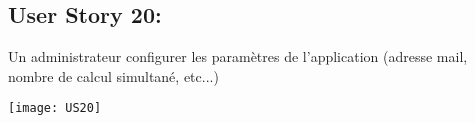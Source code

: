 \newpage{}
\subsection{User Story 20:}
Un administrateur configurer les paramètres de l'application (adresse mail, nombre de calcul simultané, etc...)


  \begin{center}
        \texttt{[image: US20]}
  \end{center}